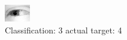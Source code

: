 \begin{figure}[h!]
\begin{center}
\includegraphics[width=0.60\columnwidth]{figures/ID2440_class_3_target_4.png}
\end{center}
\caption{ Classification: 3 actual target: 4}
\label{fig:ID2440_class_3_target_4}
\end{figure}
